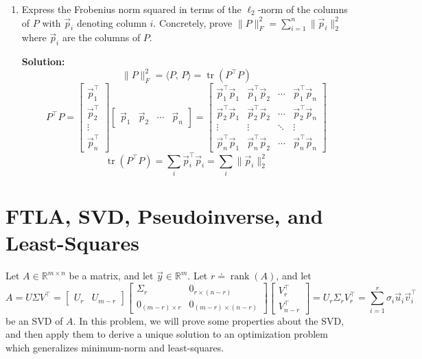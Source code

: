 \documentclass[10pt]{article}
\theoremstyle{definition}
\theoremstyle{plain}
\newcommand{\RR}{\mathbb{R}}
\DeclareMathOperator{\rank}{rank}
\DeclareMathOperator{\trace}{tr}
\begin{document}
\begin{enumerate}[label=(\alph*)]
\item Express the Frobenius norm squared in terms of the $\ell_2$-norm of the columns of $P$ with $\vec{p}_i$ denoting column $i$. Concretely, prove $\|P\|_F^2 = \sum_{i=1}^{n} \|\vec{p}_i\|_2^2$ where $\vec{p}_i$ are the columns of $P$.

\textbf{Solution:}
\begin{equation}
\|P\|_F^2 = \langle P,\, P \rangle = \trace\!\left(P^\top P\right)
\end{equation}
\begin{equation}
P^\top P = \begin{bmatrix} \vec{p}_1^\top \\ \vec{p}_2^\top \\ \vdots \\ \vec{p}_n^\top \end{bmatrix}
\begin{bmatrix} \vec{p}_1 & \vec{p}_2 & \cdots & \vec{p}_n \end{bmatrix}
= \begin{bmatrix}
\vec{p}_1^\top \vec{p}_1 & \vec{p}_1^\top \vec{p}_2 & \cdots & \vec{p}_1^\top \vec{p}_n \\
\vec{p}_2^\top \vec{p}_1 & \vec{p}_2^\top \vec{p}_2 & \cdots & \vec{p}_2^\top \vec{p}_n \\
\vdots & \vdots & \ddots & \vdots \\
\vec{p}_n^\top \vec{p}_1 & \vec{p}_n^\top \vec{p}_2 & \cdots & \vec{p}_n^\top \vec{p}_n
\end{bmatrix}
\end{equation}
\begin{equation}
\trace\!\left(P^\top P\right) = \sum_i \vec{p}_i^\top \vec{p}_i = \sum_i \|\vec{p}_i\|_2^2
\end{equation}
\end{enumerate}

\newpage

\section{FTLA, SVD, Pseudoinverse, and Least-Squares}

Let $A \in \RR^{m \times n}$ be a matrix, and let $\vec{y} \in \RR^m$. Let $r \doteq \rank(A)$, and let
\begin{equation}
A = U\Sigma V^\top = \begin{bmatrix} U_r & U_{m-r} \end{bmatrix}
\begin{bmatrix} \Sigma_r & 0_{r \times (n-r)} \\ 0_{(m-r) \times r} & 0_{(m-r) \times (n-r)} \end{bmatrix}
\begin{bmatrix} V_r^\top \\ V_{n-r}^\top \end{bmatrix}
= U_r \Sigma_r V_r^\top = \sum_{i=1}^{r} \sigma_i \vec{u}_i \vec{v}_i^\top
\end{equation}
be an SVD of $A$. In this problem, we will prove some properties about the SVD, and then apply them to derive a unique solution to an optimization problem which generalizes minimum-norm and least-squares.
\end{document}
